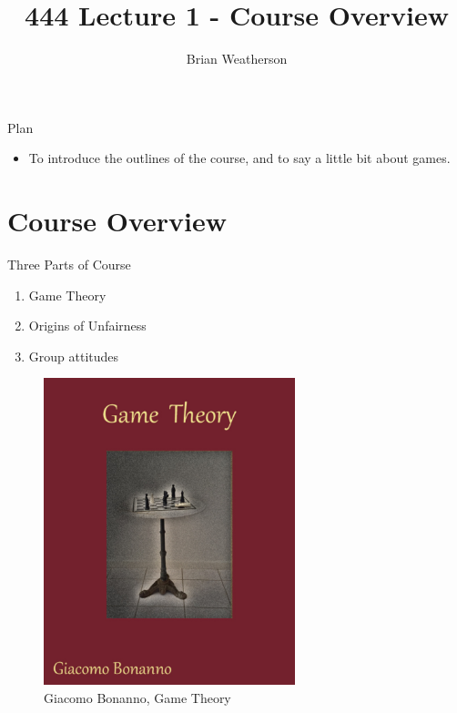 \documentclass[
  ignorenonframetext,
]{beamer}
\title{444 Lecture 1 - Course Overview}
\author{Brian Weatherson}
\date{}
\providecommand{\tightlist}{%
  \setlength{\itemsep}{0pt}\setlength{\parskip}{0pt}}
\begin{document}
\frame{\titlepage}

\begin{frame}{Plan}
\protect\hypertarget{plan}{}
\begin{itemize}
\tightlist
\item
  To introduce the outlines of the course, and to say a little bit about
  games.
\end{itemize}
\end{frame}

\hypertarget{course-overview}{%
\section{Course Overview}\label{course-overview}}

\begin{frame}{Three Parts of Course}
\protect\hypertarget{three-parts-of-course}{}
\begin{enumerate}
\tightlist
\item
  Game Theory
\item
  Origins of Unfairness
\item
  Group attitudes
\end{enumerate}
\end{frame}

\begin{frame}
\begin{figure}
\centering
\includegraphics[width=0.65\textwidth,height=0.65\textheight]{images/bonanno_cover.png}
\caption{Giacomo Bonanno, Game Theory}
\end{figure}
\end{frame}
\end{document}
